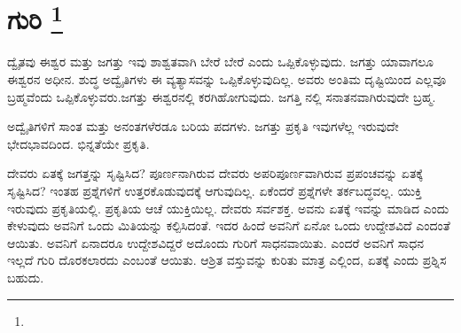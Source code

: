 
\chapter[ಗುರಿ ]{ಗುರಿ \protect\footnote{}}

ದ್ವೈತವು ಈಶ್ವರ ಮತ್ತು ಜಗತ್ತು ಇವು ಶಾಶ್ವತವಾಗಿ ಬೇರೆ ಬೇರೆ ಎಂದು ಒಪ್ಪಿಕೊಳ್ಳುವುದು. ಜಗತ್ತು ಯಾವಾಗಲೂ ಈಶ್ವರನ ಅಧೀನ. ಶುದ್ಧ ಅದ್ವೈತಿಗಳು ಈ ವ್ಯತ್ಯಾಸವನ್ನು ಒಪ್ಪಿಕೊಳ್ಳುವುದಿಲ್ಲ. ಅವರು ಅಂತಿಮ ದೃಷ್ಟಿಯಿಂದ ಎಲ್ಲವೂ ಬ್ರಹ್ಮವೆಂದು ಒಪ್ಪಿಕೊಳ್ಳುವರು.ಜಗತ್ತು ಈಶ್ವರನಲ್ಲಿ ಕರಗಿಹೋಗುವುದು. ಜಗತ್ತಿ ನಲ್ಲಿ ಸನಾತನವಾಗಿರುವುದೇ ಬ್ರಹ್ಮ.

ಅದ್ವೈತಿಗಳಿಗೆ ಸಾಂತ ಮತ್ತು ಅನಂತಗಳೆರಡೂ ಬರಿಯ ಪದಗಳು. ಜಗತ್ತು ಪ್ರಕೃತಿ ಇವುಗಳೆಲ್ಲ ಇರುವುದೇ ಭೇದಭಾವದಿಂದ. ಭಿನ್ನತೆಯೇ ಪ್ರಕೃತಿ.

ದೇವರು ಏತಕ್ಕೆ ಜಗತ್ತನ್ನು ಸೃಷ್ಟಿಸಿದ? ಪೂರ್ಣನಾಗಿರುವ ದೇವರು ಅಪರಿಪೂರ್ಣವಾಗಿರುವ ಪ್ರಪಂಚವನ್ನು ಏತಕ್ಕೆ ಸೃಷ್ಟಿಸಿದ? ಇಂತಹ ಪ್ರಶ್ನೆಗಳಿಗೆ ಉತ್ತರಕೊಡುವುದಕ್ಕೆ ಆಗುವುದಿಲ್ಲ. ಏಕೆಂದರೆ ಪ್ರಶ್ನೆಗಳೇ ತರ್ಕಬದ್ಧವಲ್ಲ. ಯುಕ್ತಿ ಇರುವುದು ಪ್ರಕೃತಿಯಲ್ಲಿ. ಪ್ರಕೃತಿಯ ಆಚೆ ಯುಕ್ತಿಯಿಲ್ಲ. ದೇವರು ಸರ್ವಶಕ್ತ. ಅವನು ಏತಕ್ಕೆ ಇವನ್ನು ಮಾಡಿದ ಎಂದು ಕೇಳುವುದು ಅವನಿಗೆ ಒಂದು ಮಿತಿಯನ್ನು ಕಲ್ಪಿಸಿದಂತೆ. ಇದರ ಹಿಂದೆ ಅವನಿಗೆ ಏನೋ ಒಂದು ಉದ್ದೇಶವಿದೆ ಎಂದಂತೆ ಆಯಿತು. ಅವನಿಗೆ ಏನಾದರೂ ಉದ್ದೇಶವಿದ್ದರೆ ಅದೊಂದು ಗುರಿಗೆ ಸಾಧನವಾಯಿತು. ಎಂದರೆ ಅವನಿಗೆ ಸಾಧನ ಇಲ್ಲದೆ ಗುರಿ ದೊರಕಲಾರದು ಎಂಬಂತೆ ಆಯಿತು. ಆಶ್ರಿತ ವಸ್ತುವನ್ನು ಕುರಿತು ಮಾತ್ರ ಎಲ್ಲಿಂದ, ಏತಕ್ಕೆ ಎಂದು ಪ್ರಶ್ನಿಸ ಬಹುದು.

